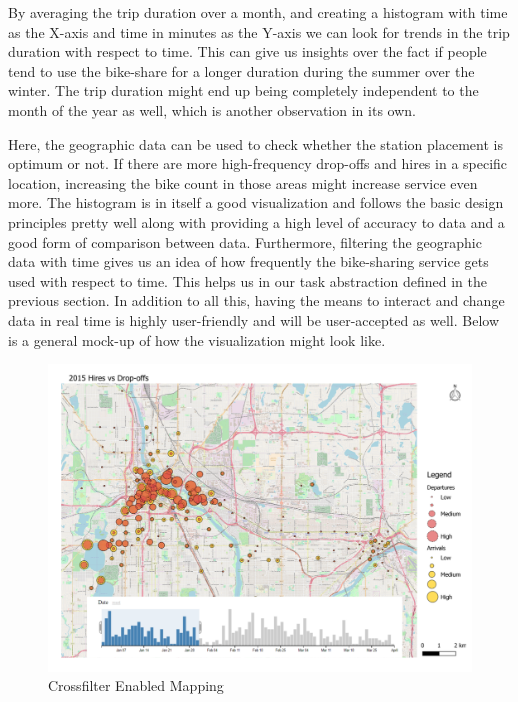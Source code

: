 By averaging the trip duration over a month, and creating a histogram with time as the X-axis and time in minutes as the Y-axis we can look for trends in the trip duration with respect to time. This can give us insights over the fact if people tend to use the bike-share for a longer duration during the summer over the winter. The trip duration might end up being completely independent to the month of the year as well, which is another observation in its own. 

Here, the geographic data can be used to check whether the station placement is optimum or not. If there are more high-frequency drop-offs and hires in a specific location, increasing the bike count in those areas might increase service even more. The histogram is in itself a good visualization and follows the basic design principles pretty well along with providing a high level of accuracy to data and a good form of comparison between data. Furthermore, filtering the geographic data with time gives us an idea of how frequently the bike-sharing service gets used with respect to time. This helps us in our task abstraction defined in the previous section. In addition to all this, having the means to interact and change data in real time is highly user-friendly and will be user-accepted as well. Below is a general mock-up of how the visualization might look like.
\begin{figure}[h]
	\centering %
	\includegraphics[scale=0.35]{figs/third_viz.PNG}
	\caption{\footnotesize{Crossfilter Enabled Mapping}}
	\label{fig:Third viz Chart}
	\captionsetup{justification=centering,margin=1cm}
	\vspace{-10pt}
\end{figure}

